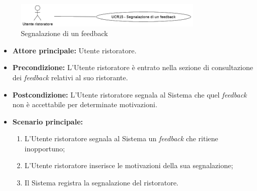 \label{usecase:Segnalazione di un feedback}

\begin{figure}[h]
	\centering
	\includegraphics[width=0.8\textwidth]{./uml/UCR15.png} 
	\caption{Segnalazione di un feedback}
	\label{fig:UCR15}
  \end{figure}

\begin{itemize}
	\item \textbf{Attore principale:} Utente ristoratore.

	\item \textbf{Precondizione:} L'Utente ristoratore è entrato nella sezione di consultazione dei \textit{feedback} relativi al suo ristorante.

	\item \textbf{Postcondizione:} L'Utente ristoratore segnala al Sistema che quel \textit{feedback} non è accettabile per determinate motivazioni.


	\item \textbf{Scenario principale:}
	      \begin{enumerate}
		      \item L'Utente ristoratore segnala al Sistema un \textit{feedback} che ritiene inopportuno;
		      \item L'Utente ristoratore inserisce le motivazioni della sua segnalazione;
		      \item Il Sistema registra la segnalazione del ristoratore.

	      \end{enumerate}
\end{itemize}
